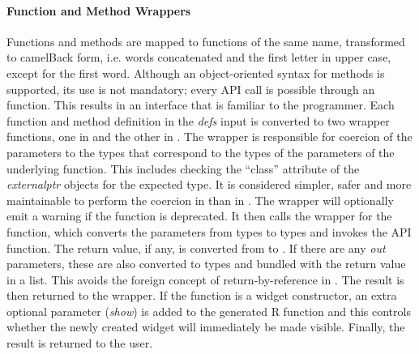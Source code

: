 \documentclass[article]{jss}
\begin{document}
\paragraph{Function and Method Wrappers}

Functions and methods are mapped to  functions of the same
name, transformed to camelBack form, i.e. words concatenated and the
first letter in upper case, except for the first word. Although an
object-oriented syntax for methods is supported, its use is not
mandatory; every API call is possible through an 
function. This results in an interface that is familiar to the
 programmer. Each function and method definition in the
\emph{defs} input is converted to two wrapper functions, one in
 and the other in .  The  wrapper
is responsible for coercion of the parameters to the 
types that correspond to the  types of the parameters of
the underlying  function. This includes checking the
``class'' attribute of the \emph{externalptr} objects for the expected
type.  It is considered simpler, safer and more maintainable to
perform the coercion in  than in . The
 wrapper will optionally emit a warning if the function is
deprecated.  It then calls the  wrapper for the function,
which converts the parameters from  types to 
types and invokes the API function. The return value, if any, is
converted from  to . If there are any
\emph{out} parameters, these are also converted to  types
and bundled with the return value in a list. This avoids the foreign
concept of return-by-reference in . The result is then
returned to the  wrapper. If the function is a widget
constructor, an extra optional parameter (\emph{show}) is added to the
generated R function and this controls whether the newly created
widget will immediately be made visible. Finally, the result is
returned to the user.
\end{document}
